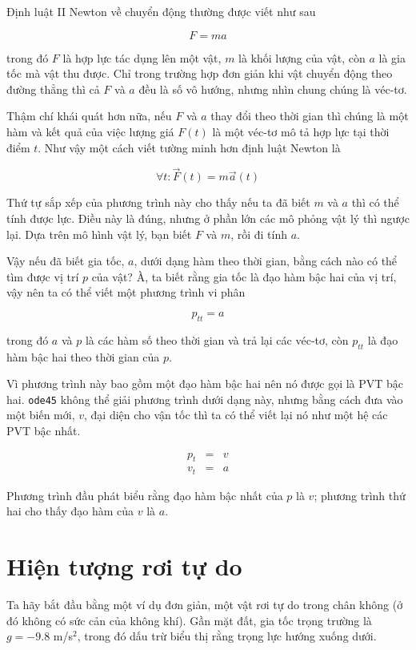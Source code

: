 \documentclass[12pt]{book}
\begin{document}
Định luật II Newton về chuyển động thường được viết như sau

\[ F = ma \]

trong đó $F$ là hợp lực tác dụng lên một vật, $m$ là khối lượng của
vật, còn $a$ là gia tốc mà vật thu được. Chỉ trong trường hợp đơn giản
khi vật chuyển động theo đường thẳng thì cả $F$ và $a$ đều là 
số vô hướng, nhưng nhìn chung chúng là véc-tơ.

Thậm chí khái quát hơn nữa, nếu $F$ và $a$ thay đổi theo thời gian
thì chúng là một hàm và kết quả của việc lượng giá $F(t)$ là một
véc-tơ mô tả hợp lực tại thời điểm $t$. Như vậy một cách viết 
tường minh hơn định luật Newton là

\[ \forall t: \vec{F}(t) = m \vec{a}(t) \]

Thứ tự sắp xếp của phương trình này cho thấy nếu ta đã biết $m$ 
và $a$ thì có thể tính được lực. Điều này là đúng, nhưng ở
phần lớn các mô phỏng vật lý thì ngược lại. Dựa trên mô hình 
vật lý, bạn biết $F$ và $m$, rồi đi tính $a$.

Vậy nếu đã biết gia tốc, $a$, dưới dạng hàm theo thời gian, bằng
cách nào có thể tìm được vị trí $p$ của vật? À, ta biết rằng gia tốc
là đạo hàm bậc hai của vị trí, vậy nên ta có thể viết một phương
trình vi phân

\[ p_{tt} = a \]

trong đó $a$ và $p$ là các hàm số theo thời gian và trả lại các
véc-tơ, còn $p_{tt}$ là đạo hàm bậc hai theo thời gian của $p$.

Vì phương trình này bao gồm một đạo hàm bậc hai nên nó được gọi là
PVT bậc hai. {\tt ode45} không thể giải phương trình dưới dạng này,
nhưng bằng cách đưa vào một biến mới, $v$, đại diện cho vận tốc
thì ta có thể viết lại nó như một hệ các PVT bậc nhất.

\begin{eqnarray*}
p_t &=& v \\
v_t &=& a
\end{eqnarray*}

Phương trình đầu phát biểu rằng đạo hàm bậc nhất của $p$ là $v$; 
phương trình thứ hai cho thấy đạo hàm của $v$ là $a$.


\section{Hiện tượng rơi tự do}
\label{freefall}

Ta hãy bắt đầu bằng một ví dụ đơn giản, một vật rơi tự do trong
chân không (ở đó không có sức cản của không khí). Gần mặt đất,
gia tốc trọng trường là $g = -9.8$ m/s$^2$, trong đó dấu trừ
biểu thị rằng trọng lực hướng xuống dưới.
\end{document}
